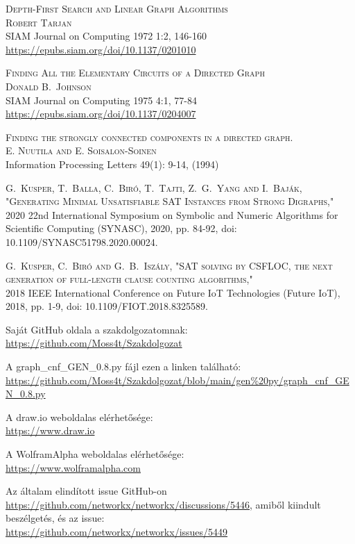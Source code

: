 \documentclass[
]{thesis-ekf}
\theoremstyle{definition}
\theoremstyle{remark}
\begin{document}
\begin{thebibliography}{2}
	\textsc{Depth-First Search and Linear Graph Algorithms
	\\Robert Tarjan}
	\\SIAM Journal on Computing 1972 1:2, 146-160
	\\\url{https://epubs.siam.org/doi/10.1137/0201010}

	\textsc{Finding All the Elementary Circuits of a Directed Graph
	\\Donald B.~Johnson}
	\\SIAM Journal on Computing 1975 4:1, 77-84
	\\\url{https://epubs.siam.org/doi/10.1137/0204007}
	
	\textsc{Finding the strongly connected components in a directed graph.}
	\\\textsc{E. Nuutila and E. Soisalon-Soinen }
	\\Information Processing Letters 49(1): 9-14, (1994)
	
	\textsc{G.~Kusper, T.~Balla, C.~Biró, T.~Tajti, Z.~G.~Yang and I.~Baják, "Generating Minimal Unsatisfiable SAT Instances from Strong Digraphs,"}
	\\2020 22nd International Symposium on Symbolic and Numeric Algorithms for Scientific Computing (SYNASC), 2020, pp. 84-92, doi: 10.1109/SYNASC51798.2020.00024.
	
	\textsc{G.~Kusper, C.~Biró and G.~B.~Iszály, "SAT solving by CSFLOC, the next generation of full-length clause counting algorithms,"}
	\\2018 IEEE International Conference on Future IoT Technologies (Future IoT), 2018, pp. 1-9, doi: 10.1109/FIOT.2018.8325589.
	
	Saját GitHub oldala a szakdolgozatomnak:
	\\\url{https://github.com/Moss4t/Szakdolgozat}
	
	A graph\_cnf\_GEN\_0.8.py fájl ezen a linken található:
	\\\url{https://github.com/Moss4t/Szakdolgozat/blob/main/gen%20py/graph_cnf_GEN_0.8.py}
	
	A draw.io weboldalas elérhetősége:
	\\\url{https://www.draw.io}
	
	A WolframAlpha weboldalas elérhetősége:
	\\\url{https://www.wolframalpha.com}
	
	Az általam elindított issue GitHub-on
	\\\url{https://github.com/networkx/networkx/discussions/5446}, amiből kiindult beszélgetés, és az issue:
	\\\url{https://github.com/networkx/networkx/issues/5449}		
\end{thebibliography}
	
\end{document}
